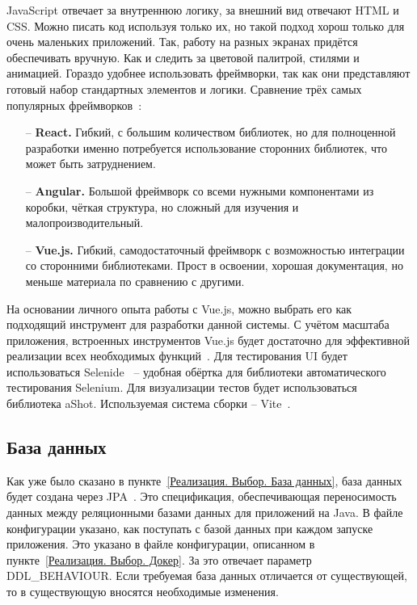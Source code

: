 \documentclass[a4paper,article]{article}
\begin{document}
\begin{sloppypar}
    JavaScript отвечает за внутреннюю логику, за внешний вид отвечают HTML и CSS. Можно писать код используя только их, но такой подход хорош только для очень маленьких приложений. Так, работу на разных экранах придётся обеспечивать вручную. Как и следить за цветовой палитрой, стилями и анимацией. Гораздо удобнее использовать фреймворки, так как они представляют готовый набор стандартных элементов и логики. Сравнение трёх самых популярных фреймворков~\cite{comparejs}:

    \begin{itemize}[nolistsep]
        \item[--] \textbf{React.} Гибкий, с большим количеством библиотек, но для полноценной разработки именно потребуется использование сторонних библиотек, что может быть затруднением.
        \item[--] \textbf{Angular.} Большой фреймворк со всеми нужными компонентами из коробки, чёткая структура, но сложный для изучения и малопроизводительный.
        \item[--] \textbf{Vue.js.} Гибкий, самодостаточный фреймворк с возможностью интеграции со сторонними библиотеками. Прост в освоении, хорошая документация, но меньше материала по сравнению с другими.
    \end{itemize}

    На основании личного опыта работы с Vue.js, можно выбрать его как подходящий инструмент для разработки данной системы. С учётом масштаба приложения, встроенных инструментов Vue.js будет достаточно для эффективной реализации всех необходимых функций~\cite{vuejs}. Для тестирования UI будет использоваться Selenide~\cite{selenide} -- удобная обёртка для библиотеки автоматического тестирования Selenium. Для визуализации тестов будет использоваться библиотека aShot. Используемая система сборки -- Vite~\cite{vite}.

    \subsection{База данных}\label{Реализация. База данных}

    Как уже было сказано в пункте~\ref{Реализация. Выбор. База данных}, база данных будет создана через JPA~\cite{springguide}. Это спецификация, обеспечивающая переносимость данных между реляционными базами данных для приложений на Java. В файле конфигурации указано, как поступать с базой данных при каждом запуске приложения. Это указано в файле конфигурации, описанном в пункте~\ref{Реализация. Выбор. Докер}. За это отвечает параметр {DDL\_BEHAVIOUR}. Если требуемая база данных отличается от существующей, то в существующую вносятся необходимые изменения.


\end{sloppypar}
\end{document}
